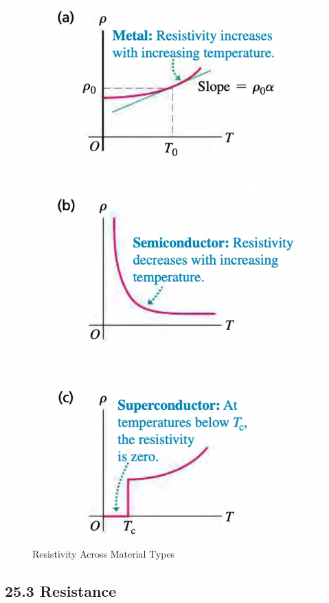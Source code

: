 \documentclass[12pt]{amsart}
\theoremstyle{definition}
\numberwithin{equation}{theorem}    %
\begin{document}
\begin{figure}[H]
    \centering
    \includegraphics[width=5in]{Media/Resistivity.png}
    \caption{Resistivity Across Material Types}
    \label{Resistivity Across Material Types}
\end{figure}

\subsection*{25.3 Resistance}
\end{document}
